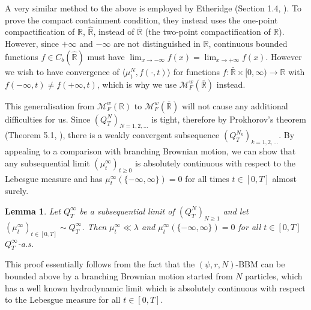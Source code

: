 \documentclass{article}
\newtheorem{lemma}[theorem]{Lemma}
\newcommand{\B}[1]{\mathbb{#1}}
\newcommand{\C}[1]{\mathcal{#1}}
\newcommand{\JB}[1]{\textcolor{blue!70!black}{\textbf{JB:} #1}}
\begin{document}
A very similar method to the above is employed by Etheridge (Section 1.4, \cite{etheridge}). To prove the compact containment condition, they instead uses the one-point compactification of $\B{R}$, $\hat{\B{R}}$, instead of $\bar{\B{R}}$ (the two-point compactification of $\B{R}$). However, since $+\infty$ and $-\infty$ are not distinguished in $\hat{\B{R}}$, continuous bounded functions $f\in C_b(\hat{\B{R}})$ must have $\lim_{x\to-\infty}f(x)=\lim_{x\to+\infty}f(x)$. However we wish to have convergence of $\langle \mu_t^N, f(\cdot,t)\rangle$ for functions $f:\bar{\B{R}}\times [0,\infty)\to \B{R}$ with $f(-\infty,t)\neq f(+\infty,t)$, which is why we use $\C{M}^w_F(\bar{\B{R}})$ instead. 

This generalisation from $\C{M}_F^w(\B{R})$ to $\C{M}_F^w(\bar{\B{R}})$ will not cause any additional difficulties for us. Since $(Q^N_T)_{N=1,2,\ldots}$ is tight, therefore by Prokhorov's theorem (Theorem 5.1, \cite{billingsley}), there is a weakly convergent subsequence $(Q^{N_k}_T)_{k=1,2,\ldots}$. By appealing to a comparison with branching Brownian motion, we can show that any subsequential limit $(\mu_t^\infty)_{t\geq 0}$ is absolutely continuous with respect to the Lebesgue measure and has $\mu_t^\infty(\{-\infty,\infty\})=0$ for all times $t\in [0,T]$ almost surely. %

\vspace{1em}

\begin{lemma} \label{absContEveryTime} Let $Q^\infty_T$ be a subsequential limit of $(Q^N_T)_{N\geq 1}$ and let $(\mu^\infty_t)_{t\in [0,T]}\sim Q^\infty_T$. Then $\mu_t^\infty\ll\lambda$ and $\mu^\infty_t(\{-\infty,\infty\})=0$ for all $t\in [0,T]$ $Q_T^\infty$-a.s. 
\end{lemma}

This proof essentially follows from the fact that the $(\psi,r,N)$-BBM can be bounded above by a branching Brownian motion started from $N$ particles, which has a well known hydrodynamic limit which is absolutely continuous with respect to the Lebesgue measure for all $t\in [0,T]$. 
\end{document}
